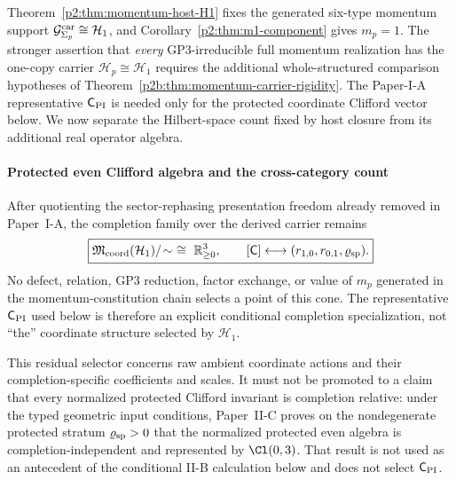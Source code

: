 \documentclass[11pt,a4paper]{article}
\begin{document}
Theorem~\ref{p2:thm:momentum-host-H1} fixes the generated six-type
momentum support \(\mathcal G^{\rm car}_{\Sigma_p}\cong\mathcal H_1\),
and Corollary~\ref{p2:thm:m1-component} gives \(m_p=1\).
The stronger assertion that \emph{every} GP3-irreducible full
momentum realization has the one-copy carrier \(\mathcal H_p\cong\mathcal H_1\)
requires the additional whole-structured comparison hypotheses of
Theorem~\ref{p2b:thm:momentum-carrier-rigidity}.  The
Paper-I-A representative \(\mathsf C_{\rm PI}\) is needed only for the protected coordinate
Clifford vector below.  We now separate the Hilbert-space count fixed by host
closure from its additional real operator algebra.

\paragraph{Protected even Clifford algebra and the cross-category count}
\label{p2:subsec:hilbert_recon}

\begin{remark}
\label{p2b:rem:coordinate-completion-selector-family}
After quotienting the sector-rephasing presentation freedom already removed in
Paper~I-A, the completion family over the derived carrier remains
\[
 \boxed{
 \mathfrak M_{\rm coord}(\mathcal H_1)/\!\sim
 \ \cong\ \mathbb R_{\ge0}^{3},\qquad
 [\mathsf C]\longleftrightarrow
 (r_{1,0},r_{0,1},\varrho_{\rm sp}).}
\]
No defect, relation, GP3 reduction, factor exchange, or value of \(m_p\)
generated in the momentum-constitution chain selects a point of this cone.
The representative \(\mathsf C_{\rm PI}\) used below is therefore an explicit
conditional completion specialization, not ``the'' coordinate structure
selected by \(\mathcal H_1\).

This residual selector concerns raw ambient coordinate actions and their
completion-specific coefficients and scales.  It must not be promoted to a
claim that every normalized protected Clifford invariant is completion
relative: under the typed geometric input conditions,
Paper~II-C proves on the nondegenerate protected stratum
\(\varrho_{\rm sp}>0\) that the normalized protected even algebra is
completion-independent and represented by \(\Cl(0,3)\).  That result is
not used as an antecedent of the conditional II-B calculation below and does
not select \(\mathsf C_{\rm PI}\).
\end{remark}
\end{document}
